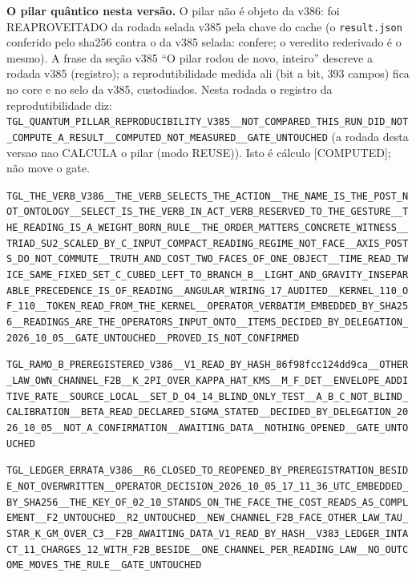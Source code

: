 \documentclass[11pt]{article}
\theoremstyle{definition}\newtheorem{deriv}{Derivação}
\begin{document}
\textbf{O pilar quântico nesta versão.} O pilar não é objeto da v386: foi REAPROVEITADO da rodada selada v385 pela chave do cache (o \texttt{result.json} conferido pelo sha256 contra o da v385 selada: confere; o veredito rederivado é o mesmo). A frase da seção v385 ``O pilar rodou de novo, inteiro'' descreve a rodada v385 (registro); a reprodutibilidade medida ali (bit a bit, 393 campos) fica no core e no selo da v385, custodiados. Nesta rodada o registro da reprodutibilidade diz: \texttt{TGL\_QUANTUM\_PILLAR\_REPRODUCIBILITY\_V385\_\_NOT\_COMPARED\_THIS\_RUN\_DID\_NOT\_COMPUTE\_A\_RESULT\_\_COMPUTED\_NOT\_MEASURED\_\_GATE\_UNTOUCHED} (a rodada desta versao nao CALCULA o pilar (modo REUSE)). Isto é cálculo \textsf{[COMPUTED]}; não move o gate.

\begin{center}\small\texttt{TGL\_THE\_VERB\_V386\_\_THE\_VERB\_SELECTS\_THE\_ACTION\_\_THE\_NAME\_IS\_THE\_POST\_NOT\_ONTOLOGY\_\_SELECT\_IS\_THE\_VERB\_IN\_ACT\_VERB\_RESERVED\_TO\_THE\_GESTURE\_\_THE\_READING\_IS\_A\_WEIGHT\_BORN\_RULE\_\_THE\_ORDER\_MATTERS\_CONCRETE\_WITNESS\_\_TRIAD\_SU2\_SCALED\_BY\_C\_INPUT\_COMPACT\_READING\_REGIME\_NOT\_FACE\_\_AXIS\_POSTS\_DO\_NOT\_COMMUTE\_\_TRUTH\_AND\_COST\_TWO\_FACES\_OF\_ONE\_OBJECT\_\_TIME\_READ\_TWICE\_SAME\_FIXED\_SET\_C\_CUBED\_LEFT\_TO\_BRANCH\_B\_\_LIGHT\_AND\_GRAVITY\_INSEPARABLE\_PRECEDENCE\_IS\_OF\_READING\_\_ANGULAR\_WIRING\_17\_AUDITED\_\_KERNEL\_110\_OF\_110\_\_TOKEN\_READ\_FROM\_THE\_KERNEL\_\_OPERATOR\_VERBATIM\_EMBEDDED\_BY\_SHA256\_\_READINGS\_ARE\_THE\_OPERATORS\_INPUT\_ONTO\_\_ITEMS\_DECIDED\_BY\_DELEGATION\_2026\_10\_05\_\_GATE\_UNTOUCHED\_\_PROVED\_IS\_NOT\_CONFIRMED}\end{center}

\begin{center}\small\texttt{TGL\_RAMO\_B\_PREREGISTERED\_V386\_\_V1\_READ\_BY\_HASH\_86f98fcc124dd9ca\_\_OTHER\_LAW\_OWN\_CHANNEL\_F2B\_\_K\_2PI\_OVER\_KAPPA\_HAT\_KMS\_\_M\_F\_DET\_\_ENVELOPE\_ADDITIVE\_RATE\_\_SOURCE\_LOCAL\_\_SET\_D\_O4\_14\_BLIND\_ONLY\_TEST\_\_A\_B\_C\_NOT\_BLIND\_CALIBRATION\_\_BETA\_READ\_DECLARED\_SIGMA\_STATED\_\_DECIDED\_BY\_DELEGATION\_2026\_10\_05\_\_NOT\_A\_CONFIRMATION\_\_AWAITING\_DATA\_\_NOTHING\_OPENED\_\_GATE\_UNTOUCHED}\end{center}

\begin{center}\small\texttt{TGL\_LEDGER\_ERRATA\_V386\_\_R6\_CLOSED\_TO\_REOPENED\_BY\_PREREGISTRATION\_BESIDE\_NOT\_OVERWRITTEN\_\_OPERATOR\_DECISION\_2026\_10\_05\_17\_11\_36\_UTC\_EMBEDDED\_BY\_SHA256\_\_THE\_KEY\_OF\_02\_10\_STANDS\_ON\_THE\_FACE\_THE\_COST\_READS\_AS\_COMPLEMENT\_\_F2\_UNTOUCHED\_\_R2\_UNTOUCHED\_\_NEW\_CHANNEL\_F2B\_FACE\_OTHER\_LAW\_TAU\_STAR\_K\_GM\_OVER\_C3\_\_F2B\_AWAITING\_DATA\_V1\_READ\_BY\_HASH\_\_V383\_LEDGER\_INTACT\_11\_CHARGES\_12\_WITH\_F2B\_BESIDE\_\_ONE\_CHANNEL\_PER\_READING\_LAW\_\_NO\_OUTCOME\_MOVES\_THE\_RULE\_\_GATE\_UNTOUCHED}\end{center}
\end{document}
